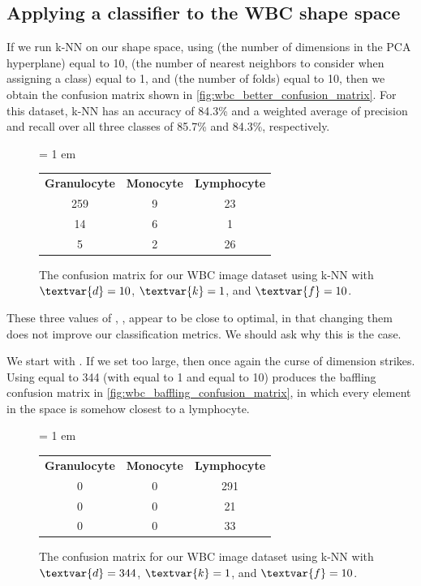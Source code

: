 \FloatBarrier
{}
\subsection{Applying a classifier to the WBC shape space}

If we run k-NN on our shape space, using  (the number of dimensions in the PCA hyperplane) equal to 10,  (the number of nearest neighbors to consider when assigning a class) equal to 1, and  (the number of folds) equal to 10, then we obtain the confusion matrix shown in \autoref{fig:wbc_better_confusion_matrix}. For this dataset, k-NN has an accuracy of 84.3\% and a weighted average of precision and recall over all three classes of 85.7\% and 84.3\%, respectively.\\

\begin{figure}[h]
\centering
\tabcolsep = 1 em
\mySfFamily
\begin{tabular}{c c c}
\rowcolor{gray!50}
\textbf{Granulocyte} & \textbf{Monocyte} & \textbf{Lymphocyte} \\
259 & 9 & 23 \\
14 & 6 & 1 \\
5 & 2 & 26
\end{tabular}
\caption{The confusion matrix for our WBC image dataset using k-NN with $\textvar{d} = \text{10}$, $\textvar{k} = \text{1}$, and $\textvar{f} = \text{10}$.}
\label{fig:wbc_better_confusion_matrix}
\end{figure}

These three values of , ,  appear to be close to optimal, in that changing them does not improve our classification metrics. We should ask why this is the case.

We start with . If we set  too large, then once again the curse of dimension strikes. Using  equal to 344 (with  equal to 1 and  equal to 10) produces the baffling confusion matrix in \autoref{fig:wbc_baffling_confusion_matrix}, in which every element in the space is somehow closest to a lymphocyte.\\

\begin{figure}[h]
\centering
\tabcolsep = 1 em
\mySfFamily
\begin{tabular}{c c c}
\rowcolor{gray!50}
\textbf{Granulocyte} & \textbf{Monocyte} & \textbf{Lymphocyte} \\
0 & 0 & 291 \\
0 & 0 & 21 \\
0 & 0 & 33
\end{tabular}
\caption{The confusion matrix for our WBC image dataset using k-NN with $\textvar{d} = \text{344}$, $\textvar{k} = \text{1}$, and $\textvar{f} = \text{10}$.}
\label{fig:wbc_baffling_confusion_matrix}
\end{figure}

